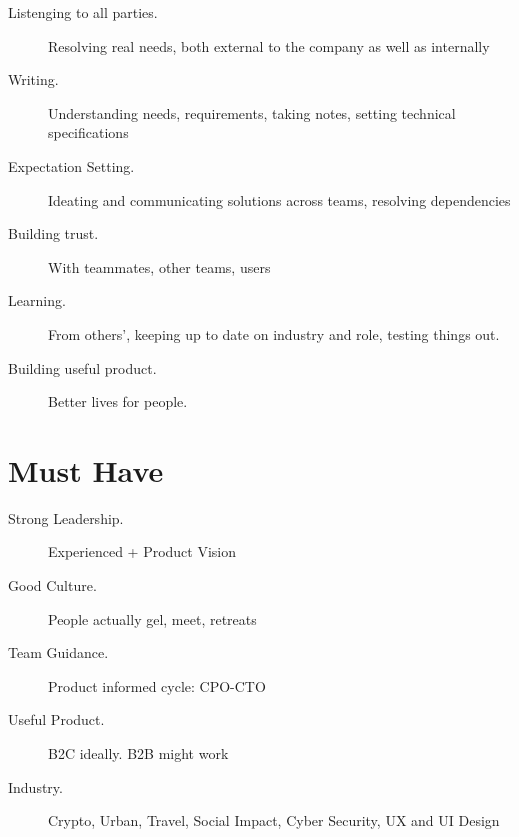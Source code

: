 \documentclass[10pt, a4paper, twocolumn]{article}
\begin{document}
\begin{description}

\item[Listenging to all parties.] Resolving real needs, both external to the company as well as internally
\item[Writing.] Understanding needs, requirements, taking notes, setting technical specifications
\item[Expectation Setting.] Ideating and communicating solutions across teams, resolving dependencies
\item[Building trust.] With teammates, other teams, users
\item[Learning.]
From others', %
keeping up to date on industry and role, testing things out.
\item[Building useful product.]
Better lives for people.

\end{description}


\section*{Must Have}

\begin{description}
 \item[Strong Leadership.] Experienced + Product Vision
 \item[Good Culture.] People actually gel, meet, retreats %
  \item[Team Guidance.] Product informed cycle: CPO-CTO
 \item[Useful Product.] B2C ideally. B2B might work
  \item[Industry.]
  Crypto,
  Urban,
  Travel,
  Social Impact,
  Cyber Security,
  UX and UI Design
\end{description}








\end{document}
